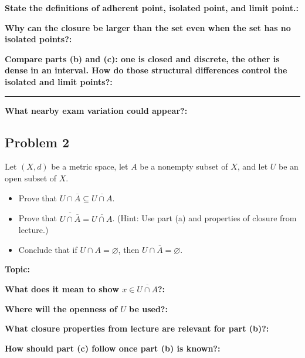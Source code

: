 \documentclass[12pt]{article}
\newcommand{\fillfield}[1]{%
  \par\noindent\textbf{#1:}\enspace\hrulefill\par\vspace{3pt}%
}
\newcommand{\fillfieldlong}[1]{%
  \par\noindent\textbf{#1:}\par\vspace{1.5cm}%
  \noindent\rule{\linewidth}{0.35pt}\par\vspace{4pt}%
}
\begin{document}
\bigskip

\begin{tcolorbox}[
  enhanced, breakable,
  colback  = reflectcyan,
  colframe = cyan!55!black,
  fonttitle = \bfseries,
  title = {\textsc{Reflection \& Variation}}
]
\fillfield{State the definitions of adherent point, isolated point, and limit point.}
\fillfield{Why can the closure be larger than the set even when the set has no isolated points?}
\fillfieldlong{Compare parts (b) and (c): one is closed and discrete, the other is dense in an interval. How do those structural differences control the isolated and limit points?}
\fillfield{What nearby exam variation could appear?}
\end{tcolorbox}

\newpage
\subsection{Problem 2}

\begin{tcolorbox}[
  enhanced, breakable,
  colback  = probblue,
  colframe = blue!55!black,
  fonttitle = \bfseries,
  title = {\textsc{Problem Statement}\hfill Homework 9, Problem 2}
]
Let $(X, d)$ be a metric space, let $A$ be a nonempty subset of $X$, and let $U$ be an open
subset of $X$.
\begin{itemize}[nosep, leftmargin=1.8em]
  \item[(a)] Prove that $U \cap \overline{A} \subseteq \overline{U \cap A}$.
  \item[(b)] Prove that $\overline{U \cap \overline{A}} = \overline{U \cap A}$. (Hint: Use part (a) and properties of closure from lecture.)
  \item[(c)] Conclude that if $U \cap A = \varnothing$, then $U \cap \overline{A} = \varnothing$.
\end{itemize}
\end{tcolorbox}

\bigskip

\begin{tcolorbox}[
  enhanced, breakable,
  colback  = pass1green,
  colframe = green!55!black,
  fonttitle = \bfseries,
  title = {Pass 1 \enspace\textbf{--}\enspace First Diagnosis}
]
\fillfield{Topic}
\fillfield{What does it mean to show $x\in\overline{U\cap A}$?}
\fillfield{Where will the openness of $U$ be used?}
\fillfield{What closure properties from lecture are relevant for part (b)?}
\fillfield{How should part (c) follow once part (b) is known?}
\end{tcolorbox}
\end{document}
